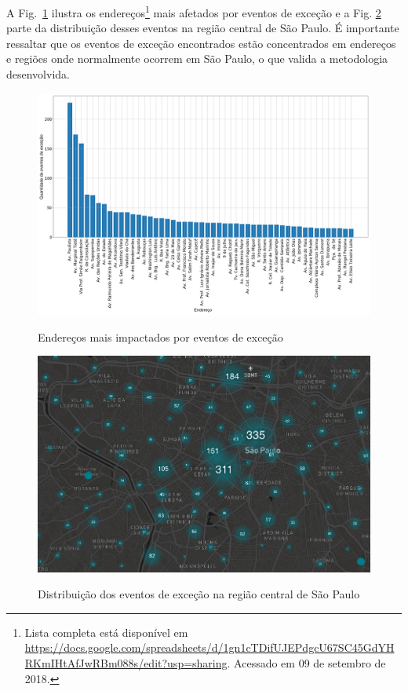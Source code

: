 \documentclass[
	12pt,				%
	oneside,			%
	a4paper,			%
	english,			%
	brazil				%
	]{abntex2ppgsi}
\begin{document}
{{A Fig.~\ref{fig:address_analysis} ilustra os endereços\footnote{Lista completa está disponível em \url{https://docs.google.com/spreadsheets/d/1gn1cTDifUJEPdgcU67SC45GdYHRKmIHtAfJwRBm088s/edit?usp=sharing}. Acessado em 09 de setembro de 2018.} mais afetados por eventos de exceção e a Fig. \ref{fig:dispersion} parte da distribuição desses eventos na região central de São Paulo. É importante ressaltar que os eventos de exceção encontrados estão concentrados em endereços e regiões onde normalmente ocorrem em São Paulo, o que valida a metodologia desenvolvida.

\begin{figure}[!htb]
	\centering
 	  \caption{Endereços mais impactados por eventos de exceção}
		\includegraphics[width=1\linewidth]{images/address_analysis_pt.png}
	\label{fig:address_analysis}
\end{figure}

\begin{figure}[!htb]
	\centering
 	  \caption{Distribuição dos eventos de exceção na região central de São Paulo}
		\includegraphics[width=1\linewidth]{images/exception_events_sp.png}
	\label{fig:dispersion}
\end{figure}

}}
\end{document}
